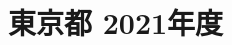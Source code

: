 \documentclass[../../hsm_tok_q.tex]{subfiles}
\begin{document}
    \section{東京都 2021年度}
    \subsection{　}
    
    \newpage
    \subsection{　}
    
    \newpage
    \subsection{　}
    
    \newpage
    \subsection{　}
    
    \newpage
    \subsection{　}
    
\end{document}
